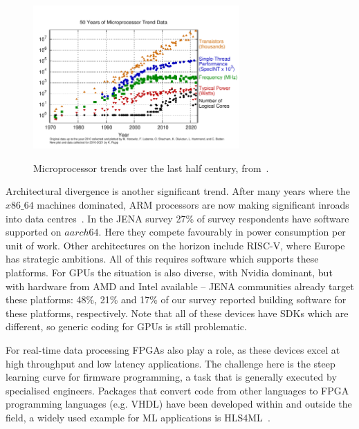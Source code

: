 \begin{figure}[htbp]
\begin{center}
\includegraphics[width=0.7\textwidth]{figures/50-years-processor-trend.pdf} \\ 
\caption{Microprocessor trends over the last half century, from~\cite{KRupp_Microprocessor_Data}.}
\label{figures:Fig5}
\end{center}
\end{figure}


Architectural divergence is another significant trend. After many years where the $x86\_64$ machines dominated, ARM processors are now making significant inroads into data centres~\cite{ARM_Datacentre}. In the JENA survey 27\% of survey respondents have software supported on $aarch64$. Here they compete favourably in power consumption per unit of work. Other architectures on the horizon include RISC-V, where Europe has strategic ambitions. All of this requires software which supports these platforms. For GPUs the situation is also diverse, with Nvidia dominant\cite{Datacentre_report}, but with hardware from AMD and Intel available -- JENA communities already target these platforms: 48\%, 21\% and 17\% of our survey reported building software for these platforms, respectively. Note that all of these devices have SDKs which are different, so generic coding for GPUs is still problematic. 

For real-time data processing FPGAs also play a role, as these devices excel at high throughput and low latency applications. The challenge here is the steep learning curve for firmware programming, a task that is generally executed by specialised engineers. Packages that convert code from other languages to FPGA programming languages (e.g. VHDL) have been developed within and outside the field, a widely used example for ML applications is HLS4ML~\cite{Duarte:2018ite}.


